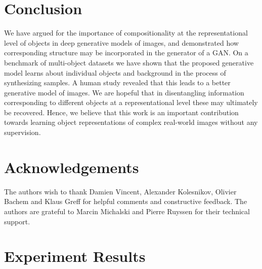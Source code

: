 \documentclass{article}
\begin{document}
\section{Conclusion}
We have argued for the importance of compositionality at the representational level of objects in deep generative models of images, and demonstrated how corresponding structure may be incorporated in the generator of a GAN.
On a benchmark of multi-object datasets we have shown that the proposed generative model learns about individual objects and background in the process of synthesizing samples.
A human study revealed that this leads to a better generative model of images.
We are hopeful that in disentangling information corresponding to different objects at a representational level these may ultimately be recovered.
Hence, we believe that this work is an important contribution towards learning object representations of complex real-world images without any supervision.

\section*{Acknowledgements}

The authors wish to thank Damien Vincent, Alexander Kolesnikov, Olivier Bachem and Klaus Greff for helpful comments and
constructive feedback.
The authors are grateful to Marcin Michalski and Pierre Ruyssen for their technical support. 





\newpage
\appendix                                     

\section{Experiment Results}
\label{app:experiment_results}
\end{document}
